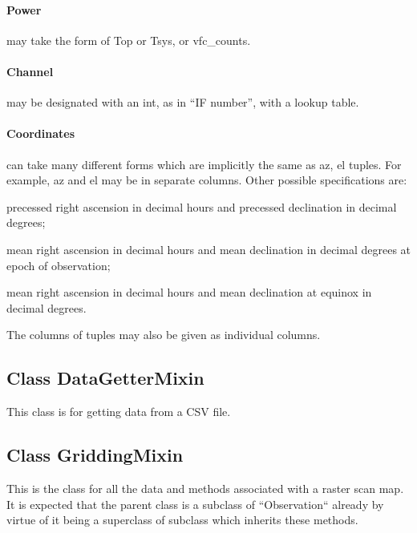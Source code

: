 \documentclass[letterpaper,11pt]{report}
\begin{document}
\paragraph{Power} may take the form of {\ttfamily Top} or {\ttfamily Tsys}, or {\ttfamily vfc\_counts}.

\paragraph{Channel} may be designated with an {\ttfamily int}, as in ``IF number'', with a lookup table.

\paragraph{Coordinates} can take many different forms which are implicitly the same as {\ttfamily az, el} tuples. For example, {\ttfamily az} and {\ttfamily el} may be in separate columns.  Other possible specifications are:
\begin{description}\itemsep0pt \parskip0pt 
	\item[radec] [{\ttfamily (float,float)}] precessed right ascension in decimal hours and precessed declination in decimal degrees;
	\item[radec1950]  [{\ttfamily (float,float)}] mean right ascension in decimal hours and mean declination in decimal degrees at epoch of observation;
	\item[radec2000] [{\ttfamily (float,float)}] mean right ascension in decimal hours and mean declination at equinox in decimal degrees.
\end{description}
The columns of tuples may also be given as individual columns.

\subsection{Class {\ttfamily DataGetterMixin}}

This class is for getting data from a CSV file.

\subsection{Class {\ttfamily GriddingMixin}}

This is the class for all the data and methods associated with a raster scan map.  It is expected that the parent class is a subclass of ``Observation`` already by virtue of it being a superclass of subclass which inherits these methods.
\end{document}
